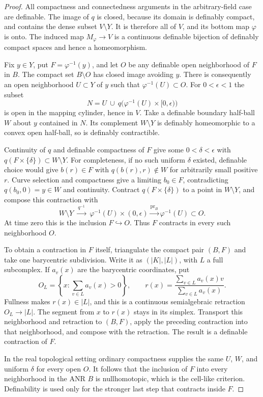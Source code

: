 \begin{proof}
All compactness and connectedness arguments in the arbitrary-field
case are definable. The image of $q$ is closed, because its domain is
definably compact, and contains the dense subset $V\setminus Y$.
It is therefore all of $V$, and its bottom map $\varphi$ is onto.
The induced map $M_\varphi\to V$ is a continuous definable bijection
of definably compact spaces and hence a homeomorphism.

Fix $y\in Y$, put $F=\varphi^{-1}(y)$, and let $O$ be any definable
open neighborhood of $F$ in $B$. The compact set $B\setminus O$ has
closed image avoiding $y$. There is consequently an open neighborhood
$U\subset Y$ of $y$ such that $\varphi^{-1}(U)\subset O$.
For $0<\epsilon<1$ the subset
\[
 N=U\ \cup\ q\bigl(\varphi^{-1}(U)\times[0,\epsilon)\bigr)
\]
is open in the mapping cylinder, hence in $V$. Take a definable
boundary half-ball $W$ about $y$ contained in $N$. Its complement
$W\setminus Y$ is definably homeomorphic to a convex open half-ball,
so is definably contractible.

Continuity of $q$ and definable compactness of $F$ give some
$0<\delta<\epsilon$ with
$q(F\times\{\delta\})\subset W\setminus Y$. For completeness,
if no such uniform $\delta$ existed, definable choice would give
$b(r)\in F$ with $q(b(r),r)\notin W$ for arbitrarily small positive
$r$. Curve selection and compactness give a limiting $b_0\in F$,
contradicting $q(b_0,0)=y\in W$ and continuity. Contract
$q(F\times\{\delta\})$ to a point in $W\setminus Y$, and compose
this contraction with
\[
 W\setminus Y\ \xrightarrow{\ q^{-1}\ }\
 \varphi^{-1}(U)\times(0,\epsilon)
 \xrightarrow{\operatorname{pr}_B}\varphi^{-1}(U)\subset O.
\]
At time zero this is the inclusion $F\hookrightarrow O$.
Thus $F$ contracts in every such neighborhood $O$.

To obtain a contraction in $F$ itself, triangulate the compact pair
$(B,F)$ and take one barycentric subdivision. Write it as $(|K|,|L|)$,
with $L$ a full subcomplex. If $a_v(x)$ are the barycentric coordinates,
put
\[
 O_L=\left\{x:\sum_{v\in L}a_v(x)>0\right\},\qquad
 r(x)=\frac{\sum_{v\in L}a_v(x)v}{\sum_{v\in L}a_v(x)}.
\]
Fullness makes $r(x)\in|L|$, and this is a continuous semialgebraic
retraction $O_L\to|L|$. The segment from $x$ to $r(x)$ stays in its
simplex. Transport this neighborhood and retraction to $(B,F)$,
apply the preceding contraction into that neighborhood, and compose
with the retraction. The result is a definable contraction of $F$.

In the real topological setting ordinary compactness supplies the
same $U$, $W$, and uniform $\delta$ for every open $O$. It follows
that the inclusion of $F$ into every neighborhood in the ANR $B$
is nullhomotopic, which is the cell-like criterion. Definability is
used only for the stronger last step that contracts inside $F$.
\end{proof}

